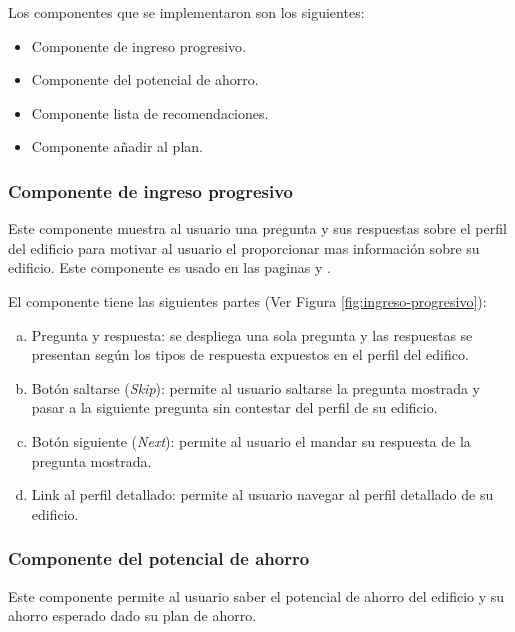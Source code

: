 Los componentes que se implementaron son los siguientes:
\begin{itemize}
\item Componente de ingreso progresivo.
\item Componente del potencial de ahorro.
\item Componente lista de recomendaciones.
\item Componente añadir al plan.
\end{itemize}


\subsubsection{Componente de ingreso progresivo}

Este componente muestra al usuario una pregunta y sus respuestas sobre el
perfil del edificio para motivar al usuario el proporcionar mas información
sobre su edificio. Este componente es usado en las paginas 
y .

El componente tiene las siguientes partes (Ver Figura \ref{fig:ingreso-progresivo}):
\begin{enumerate}[a)]
\item Pregunta y respuesta: se despliega una sola pregunta y
  las respuestas se presentan según los tipos de respuesta expuestos
  en el perfil del edifico.
\item Botón saltarse (\textit{Skip}): permite al usuario saltarse
  la pregunta mostrada y pasar a la siguiente pregunta sin contestar del perfil
  de su edificio.
\item Botón siguiente (\textit{Next}): permite al usuario el mandar
  su respuesta de la pregunta mostrada.
\item Link al perfil detallado: permite al usuario navegar al perfil
  detallado de su edificio.
\end{enumerate}

\subsubsection{Componente del potencial de ahorro}

Este componente permite al usuario saber el potencial de ahorro del edificio y su
ahorro esperado dado su plan de ahorro.

